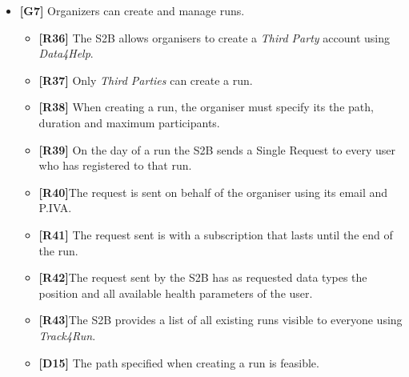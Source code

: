 \documentclass[titlepage]{article}
\begin{document}
\begin{itemize}
					 \begin{itemize} %
					 	\item {\bf [R33]} Only private users can choose whether or not to enable {\it AutomatedSOS}. 
\item {\bf [R34]} {\it AutomatedSOS} can be enabled only if the user grants permission to make emergency phone calls. 
\item {\bf [R35]} If {\it AutomatedSOS} is enabled and the {\it System} detects that a user’s heart rate is below or above the critical threshold for his age, an ambulance is called. 
\item {\bf [D4]} Data provided to the {\it System} is related to the person whose account was used to provide it.
\item {\bf [D5]} All health data directly provided by the user represents his real health status.
\item {\bf [D6]}Position data has an accuracy of 10 meters around the actual position.
\item {\bf [D7]} Health data has a relative error lower than 5%
\item {\bf [D8]}Permission to access health and GPS data is always granted to the S2B.
\item {\bf [D12]} Permission to make calls is always granted to the S2B.
\item {\bf [D13]} Users’ smartphones always have signal when needed by {\it AutomatedSOS}.
					\end{itemize}
					
					 \item {\bf [G7]}  Organizers can create and manage runs.
				 
					 \begin{itemize} %
					 	\item {\bf [R36]} The S2B allows organisers to create a {\it Third Party} account using {\it Data4Help}.
\item {\bf [R37]} Only {\it Third Parties} can create a run.
\item {\bf [R38]} When creating a run, the organiser must specify its the path, duration and maximum participants.
\item {\bf [R39]} On the day of a run the S2B sends a Single Request to every user who has registered to that run.
\item {\bf [R40]}The request is sent on behalf of the organiser using its email and P.IVA.
\item {\bf [R41]} The request sent is with a subscription that lasts until the end of the run.
\item {\bf [R42]}The request sent by the S2B has as requested data types the position and all available health parameters of the user.
\item {\bf [R43]}The S2B provides a list of all existing runs visible to everyone using {\it Track4Run}.
\item {\bf [D15]} The path specified when creating a run is feasible. 


\end{itemize}
\end{itemize}
\end{document}
